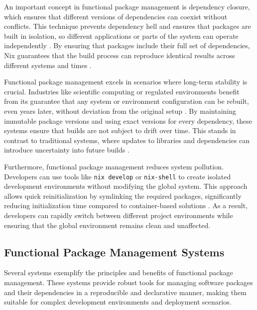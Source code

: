 An important concept in functional package management is dependency closure,
which ensures that different versions of dependencies can coexist without conflicts.
This technique prevents dependency hell and ensures that packages are built in isolation,
so different applications or parts of the system can operate independently
\cite[Chapter 3.3]{dolstraPurelyFunctionalSoftware2006}. By ensuring that packages
include their full set of dependencies, Nix guarantees that the build process can
reproduce identical results across different systems and times
\cite[Section 2.1]{courtesFunctionalPackageManagement2013}.

Functional package management excels in scenarios where long-term stability
is crucial. Industries like scientific computing or regulated environments benefit
from its guarantee that any system or environment configuration can be rebuilt,
even years later, without deviation from the original setup
\cite[Section 2, Page 5]{rahmanWorksMeCannot2022}. By maintaining immutable
package versions and using exact versions for every dependency, these systems ensure
that builds are not subject to drift over time. This stands in contrast to traditional
systems, where updates to libraries and dependencies can introduce uncertainty into
future builds \cite[Chapter 5.2]{dolstraPurelyFunctionalSoftware2006}.

Furthermore, functional package management reduces system pollution. Developers can
use tools like \texttt{nix develop} or \texttt{nix-shell} to create isolated development
environments without modifying the global system. This approach allows quick
reinitialization by symlinking the required packages, significantly reducing
initialization time compared to container-based solutions
\cite{NixDevelopNix, NixshellNixReference}. As a result, developers can rapidly
switch between different project environments while ensuring that the global
environment remains clean and unaffected.

\subsection{Functional Package Management Systems}

Several systems exemplify the principles and benefits of functional package management.
These systems provide robust tools for managing software packages and their dependencies
in a reproducible and declarative manner, making them suitable for complex development
environments and deployment scenarios.

